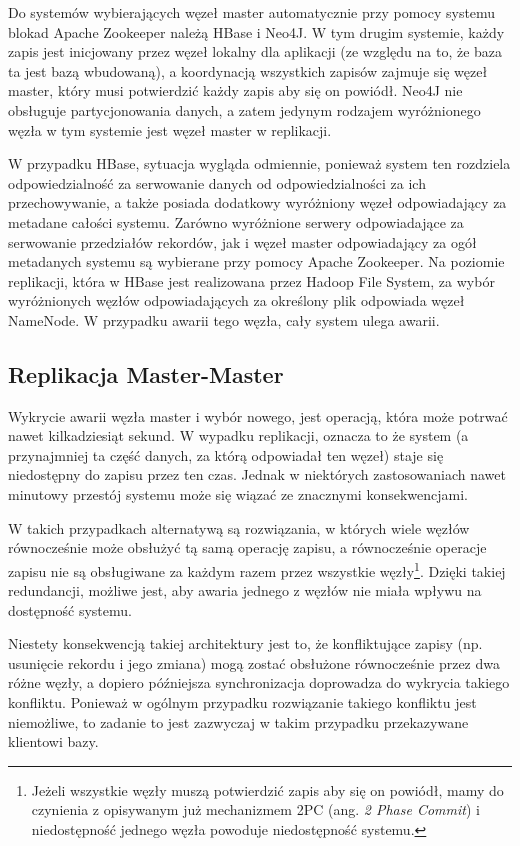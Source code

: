 Do systemów wybierających węzeł master automatycznie przy pomocy systemu blokad Apache Zookeeper należą HBase i Neo4J.
W tym drugim systemie, każdy zapis jest inicjowany przez węzeł lokalny dla aplikacji (ze względu na to, że baza ta jest bazą wbudowaną), a koordynacją wszystkich zapisów zajmuje się węzeł master, który musi potwierdzić każdy zapis aby się on powiódł.
Neo4J nie obsługuje partycjonowania danych, a zatem jedynym rodzajem wyróżnionego węzła w tym systemie jest węzeł master w replikacji.

W przypadku HBase, sytuacja wygląda odmiennie, ponieważ system ten rozdziela odpowiedzialność za serwowanie danych od odpowiedzialności za ich przechowywanie, a także posiada dodatkowy wyróżniony węzeł odpowiadający za metadane całości systemu.
Zarówno wyróżnione serwery odpowiadające za serwowanie przedziałów rekordów, jak i węzeł master odpowiadający za ogół metadanych systemu są wybierane przy pomocy Apache Zookeeper.
Na poziomie replikacji, która w HBase jest realizowana przez Hadoop File System, za wybór wyróżnionych węzłów odpowiadających za określony plik odpowiada węzeł NameNode.
W przypadku awarii tego węzła, cały system ulega awarii.

\subsection*{Replikacja Master-Master}

Wykrycie awarii węzła master i wybór nowego, jest operacją, która może potrwać nawet kilkadziesiąt sekund.
W wypadku replikacji, oznacza to że system (a przynajmniej ta część danych, za którą odpowiadał ten węzeł) staje się niedostępny do zapisu przez ten czas.
Jednak w niektórych zastosowaniach nawet minutowy przestój systemu może się wiązać ze znacznymi konsekwencjami.

W takich przypadkach alternatywą są rozwiązania, w których wiele węzłów równocześnie może obsłużyć tą samą operację zapisu, a równocześnie operacje zapisu nie są obsługiwane za każdym razem przez wszystkie węzły\footnote{Jeżeli wszystkie węzły muszą potwierdzić zapis aby się on powiódł, mamy do czynienia z opisywanym już mechanizmem 2PC (ang. \emph{2 Phase Commit}) i niedostępność jednego węzła powoduje niedostępność systemu.}.
Dzięki takiej redundancji, możliwe jest, aby awaria jednego z węzłów nie miała wpływu na dostępność systemu.

Niestety konsekwencją takiej architektury jest to, że konfliktujące zapisy (np. usunięcie rekordu i jego zmiana) mogą zostać obsłużone równocześnie przez dwa różne węzły,  a dopiero późniejsza synchronizacja doprowadza do wykrycia takiego konfliktu.
Ponieważ w ogólnym przypadku rozwiązanie takiego konfliktu jest niemożliwe, to zadanie to jest zazwyczaj w takim przypadku przekazywane klientowi bazy.

